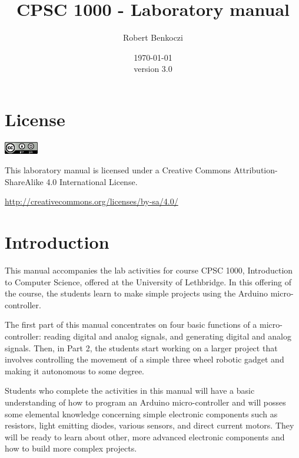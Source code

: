 \documentclass[12pt]{book}
\title{CPSC 1000 - Laboratory manual}    %
\author{Robert Benkoczi}              %
\date{\today\\ version 3.0}  %
\begin{document}
\frontmatter                            %
\maketitle                              %
\tableofcontents                        %

\chapter{License}


\includegraphics[width=4em]{by-sa.png}

\noindent
This laboratory manual is licensed under a Creative Commons
Attribution-ShareAlike 4.0 International License.

\noindent
\url{http://creativecommons.org/licenses/by-sa/4.0/}

\chapter{Introduction}

This manual accompanies the lab activities for course CPSC 1000,
Introduction to Computer Science, offered at the University of
Lethbridge. In this offering of the course, the students learn to
make simple projects using the Arduino micro-controller. 

The first part of this manual concentrates on four basic functions of
a micro-controller: reading digital and analog signals, and generating
digital and analog signals. Then, in Part 2, the students start
working on a larger project that involves controlling the movement of
a simple three wheel robotic gadget and making it autonomous to some
degree.

Students who complete the activities in this manual will have a basic
understanding of how to program an Arduino micro-controller and will
posses some elemental knowledge concerning simple electronic
components such as resistors, light emitting diodes, various sensors,
and direct current motors. They will be ready to learn about other, more
advanced electronic components and how to build more complex projects.
\end{document}
